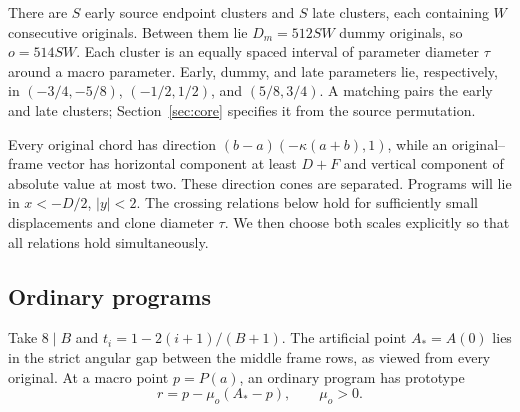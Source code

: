 There are $S$ early source endpoint clusters and $S$ late clusters, each containing $W$ consecutive originals. Between them lie $D_m=512SW$ dummy originals, so $o=514SW$. Each cluster is an equally spaced interval of parameter diameter $\tau$ around a macro parameter. Early, dummy, and late parameters lie, respectively, in $(-3/4,-5/8)$, $(-1/2,1/2)$, and $(5/8,3/4)$. A matching pairs the early and late clusters; Section~\ref{sec:core} specifies it from the source permutation.

Every original chord has direction $(b-a)(-\kappa(a+b),1)$, while an original--frame vector has horizontal component at least $D+F$ and vertical component of absolute value at most two. These direction cones are separated. Programs will lie in $x<-D/2$, $|y|<2$. The crossing relations below hold for sufficiently small displacements and clone diameter $\tau$. We then choose both scales explicitly so that all relations hold simultaneously.

\subsection{Ordinary programs}
Take $8\mid B$ and $t_i=1-2(i+1)/(B+1)$. The artificial point $A_*=A(0)$ lies in the strict angular gap between the middle frame rows, as viewed from every original. At a macro point $p=P(a)$, an ordinary program has prototype
\begin{equation}\label{eq:ordinary-prototype}
r=p-\mu_o(A_*-p),\qquad \mu_o>0.
\end{equation}

